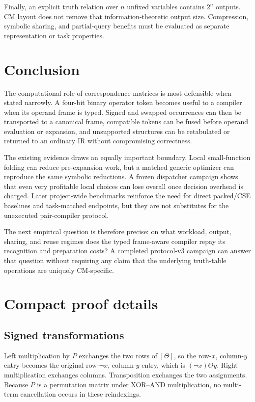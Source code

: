\documentclass[10pt]{article}
\theoremstyle{plain}
\theoremstyle{definition}
\theoremstyle{remark}
\begin{document}
Finally, an explicit truth relation over $n$ unfixed variables contains $2^n$ outputs. CM layout does not remove that information-theoretic output size. Compression, symbolic sharing, and partial-query benefits must be evaluated as separate representation or task properties.

\section{Conclusion}

The computational role of correspondence matrices is most defensible when stated narrowly. A four-bit binary operator token becomes useful to a compiler when its operand frame is typed. Signed and swapped occurrences can then be transported to a canonical frame, compatible tokens can be fused before operand evaluation or expansion, and unsupported structures can be retabulated or returned to an ordinary IR without compromising correctness.

The existing evidence draws an equally important boundary. Local small-function folding can reduce pre-expansion work, but a matched generic optimizer can reproduce the same symbolic reductions. A frozen dispatcher campaign shows that even very profitable local choices can lose overall once decision overhead is charged. Later project-wide benchmarks reinforce the need for direct packed/CSE baselines and task-matched endpoints, but they are not substitutes for the unexecuted pair-compiler protocol.

The next empirical question is therefore precise: on what workload, output, sharing, and reuse regimes does the typed frame-aware compiler repay its recognition and preparation costs? A completed protocol-v3 campaign can answer that question without requiring any claim that the underlying truth-table operations are uniquely CM-specific.

\appendix

\section{Compact proof details}

\subsection{Signed transformations}

Left multiplication by $P$ exchanges the two rows of $[\Theta]$, so the row-$x$, column-$y$ entry becomes the original row-$\neg x$, column-$y$ entry, which is $(\neg x)\Theta y$. Right multiplication exchanges columns. Transposition exchanges the two assignments. Because $P$ is a permutation matrix under XOR--AND multiplication, no multi-term cancellation occurs in these reindexings.
\end{document}
